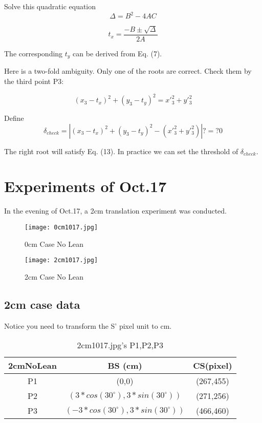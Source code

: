 \documentclass[letterpaper, 10 pt, conference]{ieeeconf}  %
\theoremstyle{remark}
\begin{document}
Solve this quadratic equation
$$\Delta = B^2 - 4AC$$

\begin{equation}
t_x= \frac{-B \pm \sqrt{\Delta} }{2A}
\end{equation}

The corresponding $t_y$ can be derived from Eq. (7).

Here is a two-fold ambiguity. Only one of the roots are correct. Check them by the third point P3:

\begin{equation}
(x_3-t_x)^2 + (y_3 - t_y)^2 = x'_3^2 + y'_3^2
\end{equation}

Define
\begin{equation}
\delta_{check} = |(x_3-t_x)^2 + (y_3 - t_y)^2  - ( x'_3^2 + y'_3^2 )| ?=? 0
\end{equation}


The right root will satisfy Eq. (13). In  practice we can set the threshold of $\delta_{check}$.

\section{Experiments of Oct.17}
In the evening of Oct.17, a 2cm translation experiment was conducted.

    \begin{figure}  
    \begin{minipage}[t]{0.5\linewidth}  
    \centering  
    \texttt{[image: 0cm1017.jpg]}  
    \caption{0cm Case No Lean}  
    \label{fig:side:a}  
    \end{minipage}%
    \begin{minipage}[t]{0.5\linewidth}  
    \centering  
    \texttt{[image: 2cm1017.jpg]}  
    \caption{2cm Case No Lean}  
    \label{fig:side:b}  
    \end{minipage}  
    \end{figure}  

\subsection{2cm case data}

Notice you need to transform the S' pixel unit to cm.
 
\begin{table}[h]
\caption{2cm1017.jpg's P1,P2,P3 }
\label{table_example}
\begin{center}
\begin{tabular}{|c|c|c|}

\hline
2cmNoLean & BS (cm)& CS(pixel)\\
\hline

P1 & (0,0)& (267,455) \\
\hline

P2 & $(3*cos(30^\circ),3*sin(30^\circ))$ & (271,256) \\

\hline
P3 & $(-3*cos(30^\circ),3*sin(30^\circ))$ & (466,460)\\
\hline
\end{tabular}
\end{center}
\end{table}
\end{document}
